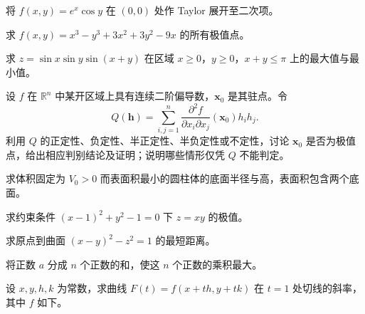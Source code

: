 \noindent\begin{minipage}{\textwidth}
将 $f(x,y)=e^x\cos y$ 在 $(0,0)$ 处作 Taylor 展开至二次项。
\end{minipage}\par\vfill
\noindent\begin{minipage}{\textwidth}
求 $f(x,y)=x^3-y^3+3x^2+3y^2-9x$ 的所有极值点。
\end{minipage}\par\vfill
\noindent\begin{minipage}{\textwidth}
求 $z=\sin x\sin y\sin(x+y)$ 在区域 $x\ge0$，$y\ge0$，$x+y\le\pi$ 上的最大值与最小值。
\end{minipage}\par\vfill
\newpage
\noindent\begin{minipage}{\textwidth}
设 $f$ 在 $\mathbb R^n$ 中某开区域上具有连续二阶偏导数，$\boldsymbol x_0$ 是其驻点。令\[Q(\boldsymbol h)=\sum_{i,j=1}^n\frac{\partial^2 f}{\partial x_i\partial x_j}(\boldsymbol x_0)h_i h_j.\]利用 $Q$ 的正定性、负定性、半正定性、半负定性或不定性，讨论 $\boldsymbol x_0$ 是否为极值点，给出相应判别结论及证明；说明哪些情形仅凭 $Q$ 不能判定。
\end{minipage}\par\vfill
\noindent\begin{minipage}{\textwidth}
求体积固定为 $V_0>0$ 而表面积最小的圆柱体的底面半径与高，表面积包含两个底面。
\end{minipage}\par\vfill
\noindent\begin{minipage}{\textwidth}
求约束条件 $(x-1)^2+y^2-1=0$ 下 $z=xy$ 的极值。
\end{minipage}\par\vfill
\noindent\begin{minipage}{\textwidth}
求原点到曲面 $(x-y)^2-z^2=1$ 的最短距离。
\end{minipage}\par\vfill
\newpage
\noindent\begin{minipage}{\textwidth}
将正数 $a$ 分成 $n$ 个正数的和，使这 $n$ 个正数的乘积最大。
\end{minipage}\par\vfill
\noindent\begin{minipage}{\textwidth}
设 $x,y,h,k$ 为常数，求曲线 $F(t)=f(x+th,y+tk)$ 在 $t=1$ 处切线的斜率，其中 $f$ 如下。
\end{minipage}\par\vfill
